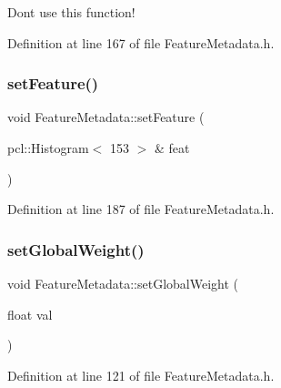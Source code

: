 Don\textquotesingle{}t use this function! 

Definition at line 167 of file Feature\+Metadata.\+h.

\mbox{\label{class_feature_metadata_acbb60bf43880c89dacd3a81b4e2d0c43}} 
\subsubsection{\texorpdfstring{set\+Feature()}{setFeature()}}
{\footnotesize\ttfamily void Feature\+Metadata\+::set\+Feature (\begin{DoxyParamCaption}\item[{pcl\+::\+Histogram$<$ 153 $>$ \&}]{feat }\end{DoxyParamCaption})\hspace{0.3cm}{\ttfamily [inline]}}



Definition at line 187 of file Feature\+Metadata.\+h.

\mbox{\label{class_feature_metadata_a135f89c383379bee9943acec65d3bdeb}} 
\subsubsection{\texorpdfstring{set\+Global\+Weight()}{setGlobalWeight()}}
{\footnotesize\ttfamily void Feature\+Metadata\+::set\+Global\+Weight (\begin{DoxyParamCaption}\item[{float}]{val }\end{DoxyParamCaption})\hspace{0.3cm}{\ttfamily [inline]}}



Definition at line 121 of file Feature\+Metadata.\+h.

\mbox{\label{class_feature_metadata_a48c33c739f9ee12a04c3cf01a09d4f47}} 

